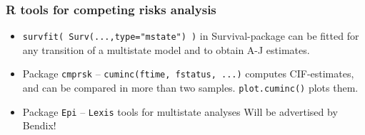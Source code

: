 \documentclass[handout,12pt,dvipsnames,t]{beamer}
\begin{document}
\begin{frame}[fragile]

\frametitle{R tools for competing risks analysis}

\begin{itemize}
\item \texttt{survfit( Surv(...,type="mstate") )} in Survival-package 
  can be fitted for any transition of a multistate model and to obtain A-J estimates.
\vspace*{1.0cm}
\item Package \texttt{cmprsk} --
 \texttt{cuminc(ftime, fstatus, ...)} 
  computes CIF-estimates,  %
  and can be compared in more than two samples.
   \texttt{plot.cuminc()} plots them. 
\vspace*{1.0cm}
\item Package \texttt{Epi} -- \texttt{Lexis} tools for multistate analyses \newline
 Will be advertised by Bendix!
 \end{itemize}

\end{frame}

% 
% 
\end{document}

